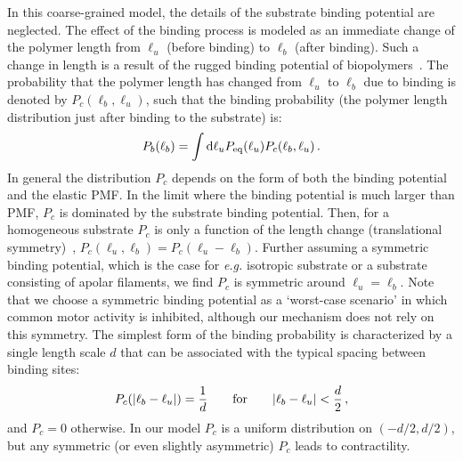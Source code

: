 \documentclass[twocolumn,prl,english]{revtex4-1}
\newcommand*\diff{\mathop{}\!\mathrm{d}}
\begin{document}
In this coarse-grained model, the details of the substrate binding potential are neglected. The effect of the binding process is modeled as an immediate change of the polymer length from $\ell_u$ (before binding) to $\ell_b$ (after binding). Such a change in length is a result of the rugged binding potential of biopolymers~\cite{Nishizaka1995,Julicher1997}. The probability that the polymer length has changed from $\ell_u$ to $\ell_b$ due to binding is denoted by $P_c(\ell_b,\ell_u)$, such that the binding probability (the polymer length distribution just after binding to the substrate) is:
\begin{align}
P_b(\ell_b) = \int \diff \ell_u P_{\rm eq}(\ell_u) P_c(\ell_b,\ell_u)\,.\label{e23}
\end{align}
In general the distribution $P_c$ depends on the form of both the binding potential and the elastic PMF. In the limit where the binding potential is much larger than PMF, $P_c$ is dominated by the substrate binding potential.  Then, for a homogeneous substrate $P_c$ is only a function of the length change (translational symmetry)~\cite{Chen2020}, $P_c(\ell_u,\ell_b)=P_c(\ell_u-\ell_b)$. Further assuming a symmetric binding potential, which is the case for {\it e.g.} isotropic substrate or a substrate consisting of apolar filaments, we find $P_c$  is symmetric around $\ell_u=\ell_b$. Note that we choose a symmetric binding potential as a `worst-case scenario' in which common motor activity is inhibited, although our mechanism does not rely on this symmetry. The simplest form of the binding probability is characterized by a single length scale $d$ that can be associated with the typical spacing between binding sites:
\begin{align}
P_c(|\ell_b-\ell_u|) = \frac 1 d \qquad{\rm for}\qquad  |\ell_b-\ell_u|< \frac d 2\,,\label{e36}
\end{align}
and $P_c=0$ otherwise.  In our model $P_c$ is a uniform distribution on  $(-d/2,d/2)$, but any symmetric (or even slightly asymmetric) $P_c$  leads to contractility. 
\end{document}
